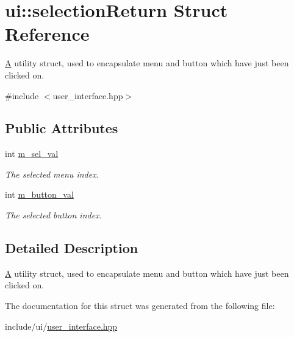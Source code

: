 \hypertarget{structui_1_1selection_return}{\section{ui\-:\-:selection\-Return Struct Reference}
\label{structui_1_1selection_return}
}


\hyperlink{struct_a}{A} utility struct, used to encapsulate menu and button which have just been clicked on.  




{\ttfamily \#include $<$user\-\_\-interface.\-hpp$>$}

\subsection*{Public Attributes}
\begin{DoxyCompactItemize}
\item 
\hypertarget{structui_1_1selection_return_acaee9774715972218b761e3633835de4}{int \hyperlink{structui_1_1selection_return_acaee9774715972218b761e3633835de4}{m\-\_\-sel\-\_\-val}}\label{structui_1_1selection_return_acaee9774715972218b761e3633835de4}

\begin{DoxyCompactList}\small\item\em The selected menu index. \end{DoxyCompactList}\item 
\hypertarget{structui_1_1selection_return_ac5058e1a6051008a43c775b6b7a5fe82}{int \hyperlink{structui_1_1selection_return_ac5058e1a6051008a43c775b6b7a5fe82}{m\-\_\-button\-\_\-val}}\label{structui_1_1selection_return_ac5058e1a6051008a43c775b6b7a5fe82}

\begin{DoxyCompactList}\small\item\em The selected button index. \end{DoxyCompactList}\end{DoxyCompactItemize}


\subsection{Detailed Description}
\hyperlink{struct_a}{A} utility struct, used to encapsulate menu and button which have just been clicked on. 

The documentation for this struct was generated from the following file\-:\begin{DoxyCompactItemize}
\item 
include/ui/\hyperlink{user__interface_8hpp}{user\-\_\-interface.\-hpp}\end{DoxyCompactItemize}
